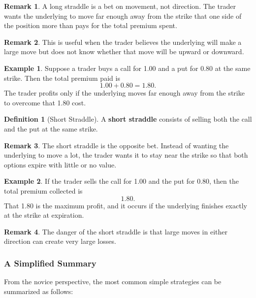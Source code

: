 \documentclass[11pt]{article}
\theoremstyle{definition}
\newtheorem{definition}{Definition}[section]
\newtheorem{example}{Example}[section]
\newtheorem{remark}{Remark}[section]
\begin{document}
\begin{remark}
A long straddle is a bet on movement, not direction. The trader wants the underlying to move far enough away from the strike that one side of the position more than pays for the total premium spent.
\end{remark}

\begin{remark}
This is useful when the trader believes the underlying will make a large move but does not know whether that move will be upward or downward.
\end{remark}

\begin{example}
Suppose a trader buys a call for 1.00 and a put for 0.80 at the same strike. Then the total premium paid is
\[
1.00 + 0.80 = 1.80.
\]
The trader profits only if the underlying moves far enough away from the strike to overcome that 1.80 cost.
\end{example}

\begin{definition}[Short Straddle]
A \textbf{short straddle} consists of selling both the call and the put at the same strike.
\end{definition}

\begin{remark}
The short straddle is the opposite bet. Instead of wanting the underlying to move a lot, the trader wants it to stay near the strike so that both options expire with little or no value.
\end{remark}

\begin{example}
If the trader sells the call for 1.00 and the put for 0.80, then the total premium collected is
\[
1.80.
\]
That 1.80 is the maximum profit, and it occurs if the underlying finishes exactly at the strike at expiration.
\end{example}

\begin{remark}
The danger of the short straddle is that large moves in either direction can create very large losses.
\end{remark}

\subsubsection{A Simplified Summary}

From the novice perspective, the most common simple strategies can be summarized as follows:
\end{document}
